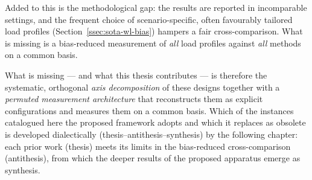 Added to this is the methodological gap: the results are reported in incomparable settings, and the
frequent choice of scenario-specific, often favourably tailored load profiles
(Section~\ref{ssec:sota-wl-bias}) hampers a fair cross-comparison. What is missing is a bias-reduced
measurement of \emph{all} load profiles against \emph{all} methods on a common basis.

What is missing --- and what this thesis contributes --- is therefore the systematic, orthogonal
\emph{axis decomposition} of these designs together with a \emph{permuted measurement architecture}
that reconstructs them as explicit configurations and measures them on a common basis. Which of the
instances catalogued here the proposed framework adopts and which it replaces as obsolete is
developed dialectically (thesis--antithesis--synthesis) by the following chapter: each prior work
(thesis) meets its limits in the bias-reduced cross-comparison (antithesis), from which the deeper
results of the proposed apparatus emerge as synthesis.
